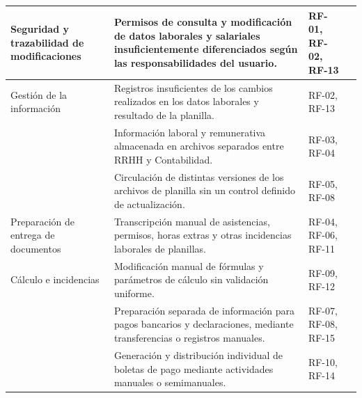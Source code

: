 \begin{longtable}{p{3.5cm} p{4.5cm} p{4cm} p{2cm}}
    Seguridad y trazabilidad de modificaciones &
     Permisos de consulta y modificación de datos laborales y salariales insuficientemente diferenciados según las responsabilidades del usuario. &
      RF-01, RF-02, RF-13 \\
    \midrule
    Gestión de la información &
     Registros insuficientes de los cambios realizados en los datos laborales y resultado de la planilla. &
      RF-02, RF-13  \\
    \midrule
    &
     Información laboral y remunerativa almacenada en archivos separados entre RRHH y Contabilidad. &
      RF-03, RF-04 \\
    \midrule
    &
     Circulación de distintas versiones de los archivos de planilla sin un control definido de actualización. &
      RF-05, RF-08 \\
    \midrule
    Preparación de entrega de documentos &
     Transcripción manual de asistencias, permisos, horas extras y otras incidencias laborales de planillas. &
      RF-04, RF-06, RF-11 \\
    \midrule
    Cálculo e incidencias &
     Modificación manual de fórmulas y parámetros de cálculo sin validación uniforme. &
      RF-09, RF-12 \\
    \midrule
    &
     Preparación separada de información para pagos bancarios y declaraciones, mediante transferencias o registros manuales. &
      RF-07, RF-08, RF-15 \\
    \midrule
    &
     Generación y distribución individual de boletas de pago mediante actividades manuales o semimanuales. &
      RF-10, RF-14 \\
\end{longtable}

